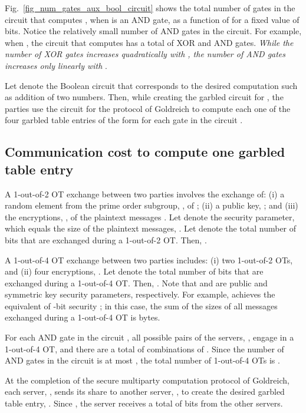 \documentclass[10pt,journal,cspaper,compsoc]{IEEEtran}
\begin{document}
Fig.~\ref{fig_num_gates_aux_bool_circuit} shows the total number of gates in the circuit that computes , when  is an AND gate, as a function of  for a fixed value of  bits. Notice the relatively small number of AND gates in the circuit. For example, when , the circuit that computes  has a total of  XOR and  AND gates. {\em While the number of XOR gates increases quadratically with , the number of AND gates increases only linearly with }.


Let  denote the Boolean circuit that corresponds to the desired computation such as addition of two numbers. Then, while creating the garbled circuit  for , the  parties use the circuit  for the protocol of Goldreich to compute each one of the four garbled table entries of the form  for each gate  in the circuit .







\subsection{Communication cost to compute one garbled table entry}
\label{sec_communication_cost_to_compute_one_entry}

A 1-out-of-2 OT exchange between two parties involves the exchange of: (i) a random element  from the prime order subgroup, , of ; (ii) a public key, ; and (iii) the encryptions, , of the plaintext messages . Let  denote the security parameter, which equals the size of the plaintext messages, . Let  denote the total number of bits that are exchanged during a 1-out-of-2 OT. Then, .


A 1-out-of-4 OT exchange between two parties includes: (i) two 1-out-of-2 OTs, and (ii) four encryptions, . Let  denote the total number of bits that are exchanged during a 1-out-of-4 OT. Then, . Note that  and  are public and symmetric key security parameters, respectively. For example,  achieves the equivalent of -bit security \cite{nist_key_len_recommendations2012}; in this case, the sum of the sizes of all messages exchanged during a 1-out-of-4 OT is  bytes.


For each AND gate in the circuit , all possible pairs of the  servers, , engage in a 1-out-of-4 OT, and there are a total of  combinations of . Since the number of AND gates in the circuit  is at most , the total number of 1-out-of-4 OTs is .


At the completion of the secure multiparty computation protocol of Goldreich, each server, , sends its share  to another server, , to create the desired garbled table entry, . Since , the server  receives a total of  bits from the other  servers.
\end{document}
